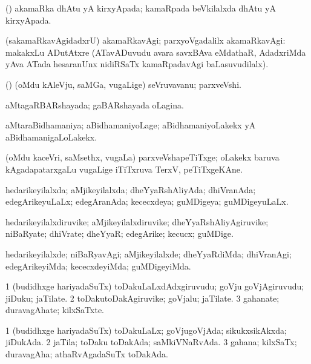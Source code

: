 \bentry
{}
\gl{\nA}
\bmng
(\vAyx) akamaRka dhAtu yA kirxyApada; kamaRpada beVkilalxda dhAtu yA kirxyApada. 
\emng
\eentry

\bentry
{}
\gl{\kirxvi}
\bmng
(sakamaRkavAgidadxrU) akamaRkavAgi; parxyoVgadalilx akamaRkavAgi:  makakxLu ADutAtxre (ATavADuvudu avara savxBAva eMdathaR, AdadxriMda yAva ATada hesaranUnx nidiRSaTx kamaRpadavAgi baLasuvudilalx). 
\emng
\eentry

\bentry
{}
\gl{\nA}
\bmng
(\pArxparx) (oMdu kAleVju, saMGa, \mo vugaLige) seVruvavanu; parxveVshi. 
\emng
\eentry

\bentry
{}
\gl{\gu}
\bmng
aMtagaRBARshayada; gaBARshayada oLagina. 
\emng
\eentry

\bentry
{}
\gl{\gu}
\bmng
aMtaraBidhamaniya; aBidhamaniyoLage; aBidhamaniyoLakekx yA aBidhamanigaLoLakekx. 
\emng
\eentry

\bentry
{}
\gl{\nA}
\bmng
(oMdu kaceVri, saMsethx, \mo vugaLa) parxveVshapeTiTxge; oLakekx baruva kAgadapatarxgaLu \mo vugaLige iTiTxruva TerxV, peTiTxgeKAne. 
\emng
\eentry

\bentry
{}
\gl{\gu}
\bmng
hedarikeyilalxda; aMjikeyilalxda; dheYyaRshAliyAda; dhiVranAda; edegArikeyuLaLx; edegAranAda; kececxdeya; guMDigeya; guMDigeyuLaLx. 
\emng
\eentry

\bentry
{}
\gl{\kirxvi}
\bmng
hedarikeyilalxdiruvike; aMjikeyilalxdiruvike; dheYyaRshAliyAgiruvike; niBaRyate; dhiVrate; dheYyaR; edegArike; kecucx; guMDige. 
\emng
\eentry

\bentry
{}
\gl{\kirxvi}
\bmng
hedarikeyilalxde; niBaRyavAgi; aMjikeyilalxde; dheYyaRdiMda; dhiVranAgi; edegArikeyiMda; kececxdeyiMda; guMDigeyiMda. 
\emng
\eentry

\bentry
{}
\gl{\nA}
\bmng
\bnum
\num{1} (budidhxge hariyadaSuTx) toDakuLaLxdAdxgiruvudu; goVju goVjAgiruvudu; jiDuku; jaTilate. 
\num{2} toDakutoDakAgiruvike; goVjalu; jaTilate. 
\num{3} gahanate; duravagAhate; kilxSaTxte. 
\enum
\emng
\eentry

\bentry
{}
\gl{\gu}
\bmng
\bnum
\num{1} (budidhxge hariyadaSuTx) toDakuLaLx; goVjugoVjAda; sikukxsikAkxda; jiDukAda. 
\num{2} jaTila; toDaku toDakAda; saMkiVNaRvAda. 
\num{3} gahana; kilxSaTx; duravagAha; athaRvAgadaSuTx toDakAda. 
\enum
\emng
\eentry

